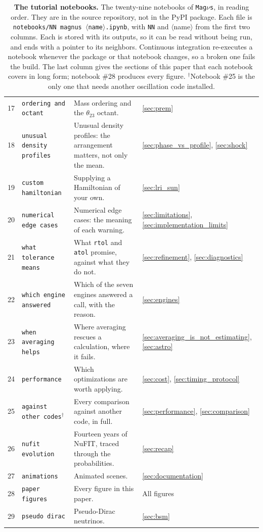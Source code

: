 \documentclass[final,5p,times,twocolumn,sort,compress]{elsarticle}
\makeatletter
\DeclareRobustCommand{\_}{%
  \ifmmode\nfss@text{\textunderscore}\else\textunderscore\allowbreak\fi}
\newcommand{\magnus}{{\tt Mag}\ensuremath{\nu}{\tt s}}
\makeatother
\begin{document}
{\begin{table}[t!]
{\begin{tabular}{@{}p{0.6cm}p{4.3cm}p{9.2cm}p{2.9cm}@{}}
 17 & {\tt ordering\_and\_octant} & Mass ordering and the $\theta_{23}$ octant. & \ref{sec:prem} \\
 18 & {\tt unusual\_density\_profiles} & Unusual density profiles: the arrangement matters, not only the mean. & \ref{sec:phase_vs_profile}, \ref{sec:shock} \\
 19 & {\tt custom\_hamiltonian} & Supplying a Hamiltonian of your own. & \ref{sec:lri_sun} \\
 20 & {\tt numerical\_edge\_cases} & Numerical edge cases: the meaning of each warning. & \ref{sec:limitations}, \ref{sec:implementation_limits} \\
 21 & {\tt what\_tolerance\_means} & What {\tt rtol} and {\tt atol} promise, against what they do not. & \ref{sec:refinement}, \ref{sec:diagnostics} \\
 22 & {\tt which\_engine\_answered} & Which of the seven engines answered a call, with the reason. & \ref{sec:engines} \\
 23 & {\tt when\_averaging\_helps} & Where averaging rescues a calculation, where it fails. & \ref{sec:averaging_is_not_estimating}, \ref{sec:astro} \\
 24 & {\tt performance} & Which optimizations are worth applying. & \ref{sec:cost}, \ref{sec:timing_protocol} \\
 25 & {\tt against\_other\_codes}$^{\dagger}$ & Every comparison against another code, in full. & \ref{sec:performance}, \ref{sec:comparison} \\
 26 & {\tt nufit\_evolution} & Fourteen years of NuFIT, traced through the probabilities. & \ref{sec:recap} \\
 27 & {\tt animations} & Animated scenes. & \ref{sec:documentation} \\
 28 & {\tt paper\_figures} & Every figure in this paper. & All figures \\
 29 & {\tt pseudo\_dirac} & Pseudo-Dirac neutrinos. & \ref{sec:bsm} \\
\end{tabular}}
\caption{\label{tab:notebooks}\textbf{The tutorial notebooks.} The twenty-nine notebooks of \magnus, in reading order. They are in the source repository, not in the PyPI package. Each file is {\tt notebooks/NN\_magnus\_$\langle$name$\rangle$.ipynb}, with {\tt NN} and $\langle$name$\rangle$ from the first two columns. Each is stored with its outputs, so it can be read without being run, and ends with a pointer to its neighbors. Continuous integration re-executes a notebook whenever the package or that notebook changes, so a broken one fails the build. The last column gives the sections of this paper that each notebook covers in long form; notebook \#28 produces every figure. $^{\dagger}$Notebook \#25 is the only one that needs another oscillation code installed.}
\end{table}}
\end{document}
